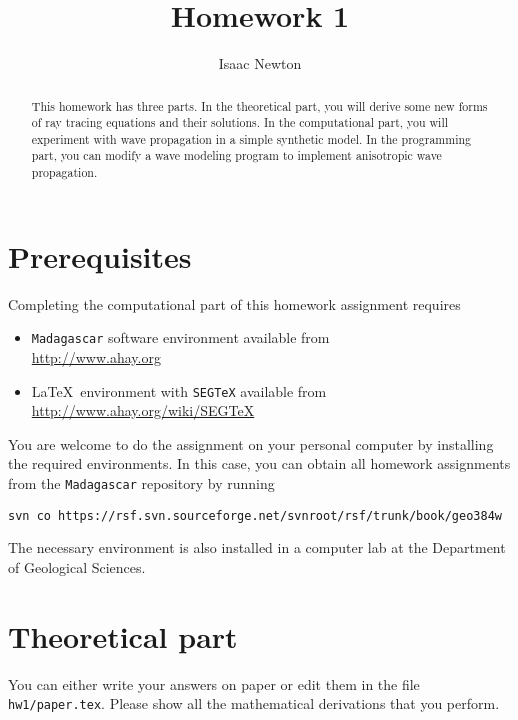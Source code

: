 \author{Isaac Newton} 
\title{Homework 1}


\begin{abstract}
  This homework has three parts. In the theoretical part, you will
  derive some new forms of ray tracing equations and their solutions.
  In the computational part, you will experiment with wave propagation
  in a simple synthetic model.  In the programming part, you can
  modify a wave modeling program to implement anisotropic wave propagation.
\end{abstract}

\section{Prerequisites}

Completing the computational part of this homework assignment requires
\begin{itemize}
\item \texttt{Madagascar} software environment available from \\
\url{http://www.ahay.org}
\item \LaTeX\ environment with \texttt{SEGTeX} available from \\ 
\url{http://www.ahay.org/wiki/SEGTeX}
\end{itemize}

You are welcome to do the assignment on your personal computer by
installing the required environments. In this case, you can obtain all
homework assignments from the \texttt{Madagascar} repository by running
\begin{verbatim}
svn co https://rsf.svn.sourceforge.net/svnroot/rsf/trunk/book/geo384w 
\end{verbatim}

The necessary environment is also installed in a computer lab
at the Department of Geological Sciences.

\section{Theoretical part}

You can either write your answers on paper or edit them in the file
\verb#hw1/paper.tex#. Please show all the mathematical
derivations that you perform.

